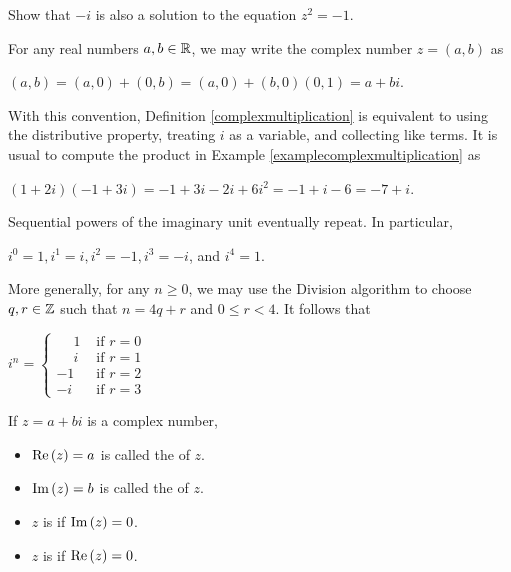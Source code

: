 \documentclass[11pt,fleqn,dvipsnames,usenames]{article}
\newcommand{\p}{\noindent}
\begin{document}
\begin{exercise}
Show that $-i$ is also a solution to the equation $z^{2} = -1$.
\end{exercise}

\notation For any real numbers $a,b\in\mathbb{R}$, we may write the complex number $z = (a,b)$ as
\begin{center}
$(a,b) = (a,0) + (0,b) = (a,0) + (b,0)(0,1) = a + bi$.
\end{center}
\vsp

\p With this convention, Definition \ref{complexmultiplication} is equivalent to using the distributive property, treating $i$ as a variable, and collecting like terms.  It is usual to compute the product in Example \ref{examplecomplexmultiplication} as
\begin{center}
$(1 + 2i)(-1 + 3i) = -1 + 3i - 2i + 6i^2 = -1 + i - 6 = -7 + i$.
\end{center}

\observation Sequential powers of the imaginary unit eventually repeat.  In particular,
\begin{center}
$i^{0} = 1, i^{1} = i, i^{2} = -1, i^{3} = -i$, and $i^{4} = 1$.
\end{center}

\p More generally, for any $n\geq 0$, we may use the Division algorithm to choose $q,r\in\mathbb{Z}$ such that $n = 4q + r$ and $0\leq r < 4$.  It follows that
\begin{center}
$i^{n} = \begin{cases}\phantom{-}1 & \text{ if } r = 0\\\phantom{-}i & \text{ if }r = 1\\-1 & \text{ if } r = 2\\-i & \text{ if }r = 3\end{cases}$
\end{center}
\vsp

\begin{definition}
If $z = a + bi$ is a complex number,
\begin{itemize}
\item $\text{Re}\left(z\right) = a$ is called the  of $z$.
\item $\text{Im}\left(z\right) = b$ is called the  of $z$. 
\item $z$ is  if $\text{Im}\left(z\right) = 0$.
\item $z$ is  if $\text{Re}\left(z\right) = 0$.
\end{itemize}
\end{definition}
\end{document}
